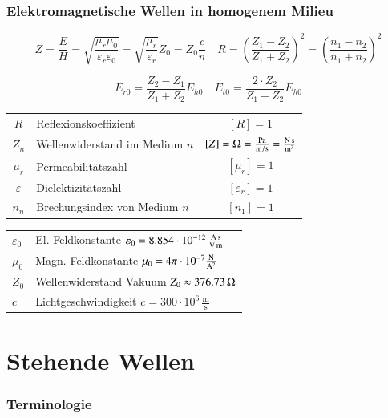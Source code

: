 \subsubsection{Elektromagnetische Wellen in homogenem Milieu}

$$ \boxed{ Z = \frac{E}{H} = \sqrt{ \frac{\mu_r \mu_0}{\varepsilon_r \varepsilon_0}} = \sqrt{\frac{\mu_r}{\varepsilon_r}} Z_0 = Z_0 \frac{c}{n}} \quad \boxed{ R = \left(  \frac{Z_1 - Z_2}{Z_1 + Z_2}  \right)^2 =  \left(  \frac{n_1 - n_2}{n_1 + n_2}  \right)^2 }$$


$$ \boxed{ E_{r0} = \frac{Z_2 - Z_1}{Z_1 + Z_2} E_{h0} } \quad \boxed{E_{t0} = \frac{2 \cdot Z_2}{Z_1 + Z_2} E_{h0}} $$

\renewcommand{\arraystretch}{1.1}
\begin{tabular}{clc}
$R$ & Reflexionskoeffizient  & $[R] = 1$ \\
$Z_n$ & Wellenwiderstand im Medium $n$ & $[Z] = \mathrm{\Omega} = \frac{\mathrm{Pa}}{\mathrm{m} / \mathrm{s}} = \frac{\mathrm{N} \, \mathrm{s}}{\mathrm{m}^3}$ \\
$\mu_r$ & Permeabilitätszahl & $[\mu_r] = 1$ \\
$\varepsilon$ & Dielektizitätszahl & $[\varepsilon_r] = 1$ \\
$n_n$ & Brechungsindex von Medium $n$ & $[n_1] = 1$ \\
\end{tabular}


\renewcommand{\arraystretch}{1.2}
\begin{tabular}{ll}
$\varepsilon_0$ & El. Feldkonstante $\varepsilon_0 = 8.854 \cdot 10^{-12} \, \frac{\mathrm{A} \, \mathrm{s}}{\mathrm{V} \, \mathrm{m}}$ \\
$\mu_0$ & Magn. Feldkonstante $\mu_0 = 4 \pi \cdot 10^{-7} \frac{\mathrm{N}}{\mathrm{A}^2}$\\
$Z_0$ & Wellenwiderstand Vakuum $Z_0 \approx 376.73 \, \mathrm{\Omega}$ \\
$c$ & Lichtgeschwindigkeit $c = 300 \cdot 10^6 \, \mathrm{\frac{m}{s}}$ \\ 
\end{tabular}
\renewcommand{\arraystretch}{1}





\section{Stehende Wellen}

\subsubsection{Terminologie}


